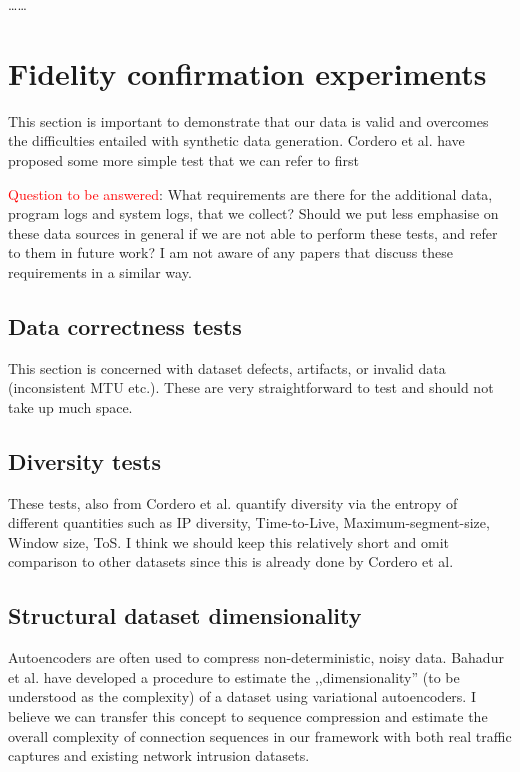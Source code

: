 \documentclass[sigconf]{acmart}
\begin{document}
\dots \dots


\section{Fidelity confirmation experiments}\label{Sec:Experiments}

This section is important to demonstrate that our data is valid and overcomes the difficulties entailed with synthetic data generation. Cordero et al. have proposed some more simple test that we can refer to first

\textcolor{red}{Question to be answered}: What requirements are there for the additional data, program logs and system logs, that we collect? Should we put less emphasise on these data sources in general if we are not able to perform these tests, and refer to them in future work? I am not aware of any papers that discuss these requirements in a similar way. 


\subsection{Data correctness tests}

This section is concerned with dataset defects, artifacts, or invalid data (inconsistent MTU etc.). These are very straightforward to test and should not take up much space. 


\subsection{Diversity tests}

These tests, also from Cordero et al. quantify diversity via the entropy of different quantities such as IP diversity, Time-to-Live, Maximum-segment-size, Window size, ToS. I think we should keep this relatively short and omit comparison to other datasets since this is already done by Cordero et al. 


\subsection{Structural dataset dimensionality}



Autoencoders are often used to compress non-deterministic, noisy data. Bahadur et al. have developed a procedure to estimate the ,,dimensionality'' (to be understood as the complexity) of a dataset using variational autoencoders. I believe we can transfer this concept to sequence compression and estimate the overall complexity of connection sequences in our framework with both real traffic captures and existing network intrusion datasets. 
\end{document}
